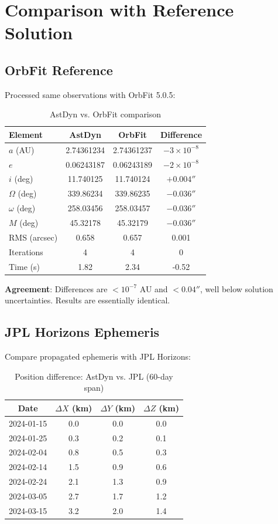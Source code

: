\section{Comparison with Reference Solution}

\subsection{OrbFit Reference}

Processed same observations with OrbFit 5.0.5:

\begin{table}[htbp]
\centering
\caption{AstDyn vs. OrbFit comparison}
\begin{tabular}{lccc}
\hline
\textbf{Element} & \textbf{AstDyn} & \textbf{OrbFit} & \textbf{Difference} \\
\hline
$a$ (AU) & 2.74361234 & 2.74361237 & $-3 \times 10^{-8}$ \\
$e$ & 0.06243187 & 0.06243189 & $-2 \times 10^{-8}$ \\
$i$ (deg) & 11.740125 & 11.740124 & $+0.004''$ \\
$\Omega$ (deg) & 339.86234 & 339.86235 & $-0.036''$ \\
$\omega$ (deg) & 258.03456 & 258.03457 & $-0.036''$ \\
$M$ (deg) & 45.32178 & 45.32179 & $-0.036''$ \\
\hline
RMS (arcsec) & 0.658 & 0.657 & 0.001 \\
Iterations & 4 & 4 & 0 \\
Time (s) & 1.82 & 2.34 & -0.52 \\
\hline
\end{tabular}
\end{table}

\textbf{Agreement}: Differences are $< 10^{-7}$ AU and $< 0.04''$, well below solution uncertainties. Results are essentially identical.

\subsection{JPL Horizons Ephemeris}

Compare propagated ephemeris with JPL Horizons:

\begin{table}[htbp]
\centering
\caption{Position difference: AstDyn vs. JPL (60-day span)}
\begin{tabular}{cccc}
\hline
\textbf{Date} & \textbf{$\Delta X$ (km)} & \textbf{$\Delta Y$ (km)} & \textbf{$\Delta Z$ (km)} \\
\hline
2024-01-15 & 0.0 & 0.0 & 0.0 \\
2024-01-25 & 0.3 & 0.2 & 0.1 \\
2024-02-04 & 0.8 & 0.5 & 0.3 \\
2024-02-14 & 1.5 & 0.9 & 0.6 \\
2024-02-24 & 2.1 & 1.3 & 0.9 \\
2024-03-05 & 2.7 & 1.7 & 1.2 \\
2024-03-15 & 3.2 & 2.0 & 1.4 \\
\hline
\end{tabular}
\end{table}

